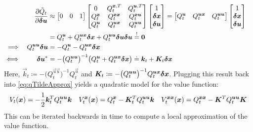 			\begin{align}
				&& \pdv{\tilde{Q}_t}{\bm{\delta u}}
					&\approx
						\begin{bmatrix}
							0 & 0 & 1
						\end{bmatrix}
						\begin{bmatrix}
							0             & Q_t^{\bm{x}, T}      & Q_t^{\bm{u}, T}      \\
							Q_t^{\bm{x}} & Q_t^{\bm{x} \bm{x}} & Q_t^{\bm{x} \bm{u}} \\
							Q_t^{\bm{u}} & Q_t^{\bm{u} \bm{x}} & Q_t^{\bm{u} \bm{u}}
						\end{bmatrix}
						\begin{bmatrix}
							1 \\
							\bm{\delta x} \\
							\bm{\delta u}
						\end{bmatrix}
					=
						\begin{bmatrix}
							Q_t^{\bm{u}} & Q_t^{\bm{u} \bm{x}} & Q_t^{\bm{u} \bm{u}}
						\end{bmatrix}
						\begin{bmatrix}
							1 \\
							\bm{\delta x} \\
							\bm{\delta u}
						\end{bmatrix} &  \nonumber \\
					&&&= Q_t^{\bm{u}} + Q_t^{\bm{u} \bm{x}} \bm{\delta x} + Q_t^{\bm{u} \bm{u}} \bm{\delta u} \bm{\delta u} \overset{!}{=} \bm{0}  \nonumber \\
				\implies && Q_t^{\bm{u} \bm{u}} \bm{\delta u} &= -Q_t^{\bm{u}} - Q_t^{\bm{u} \bm{x}} \bm{\delta x} &  \nonumber \\
				\iff && \bm{\delta u}^\ast &= -\big(Q_t^{\bm{u} \bm{u}}\big)^{-1} \big(Q_t^{\bm{u}} + Q_t^{\bm{u} \bm{x}} \bm{\delta x}\big) \doteq \bm{k}_t + \bm{K}_t \bm{\delta x} &  \label{eq:ddpFeedbackControlLaw}
			\end{align}
			Here, \( \vec{k}_t \coloneqq -\big(Q_t^{\vec{u} \vec{u}}\big)^{-1} Q_t^{\vec{u}} \) and \( \bm{K}_t \coloneqq -\big(Q_t^{\bm{u} \bm{u}}\big)^{-1} Q_t^{\bm{u} \bm{x}} \bm{\delta x} \). Plugging this result back into \eqref{eq:qTildeApprox} yields a quadratic model for the value function:
			\begin{align*}
				V_t(\bm{x}) = -\frac{1}{2} \bm{k}_t^T Q_t^{\bm{u} \bm{u}} \bm{k}
				&&
				V_t^{\bm{x}}(\bm{x}) = Q_t^{\bm{x}} - \bm{K}_t^T Q_t^{\bm{u} \bm{u}} \bm{k}
				&&
				V_t^{\bm{x} \bm{x}}(\bm{x}) = Q_t^{\bm{x} \bm{x}} - \bm{K}^T Q_t^{\bm{u} \bm{u}} \bm{K}
			\end{align*}
			This can be iterated backwards in time to compute a local approximation of the value function.

